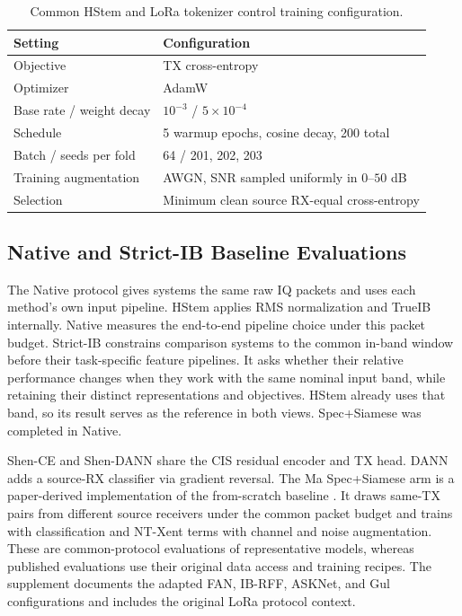 \documentclass[journal]{IEEEtran}
\begin{document}
\begin{table}[!t]\centering
\caption{Common HStem and LoRa tokenizer control training configuration.}
\label{tab:train}
\begin{tabularx}{\columnwidth}{@{}lX@{}}\toprule
Setting & Configuration\\\midrule
Objective & TX cross-entropy\\
Optimizer & AdamW \cite{loshchilov2019adamw}\\
Base rate / weight decay & \(10^{-3}\) / \(5\times10^{-4}\)\\
Schedule & 5 warmup epochs, cosine decay, 200 total\\
Batch / seeds per fold & 64 / 201, 202, 203\\
Training augmentation & AWGN, SNR sampled uniformly in \(0\)--\(50\) dB\\
Selection & Minimum clean source RX-equal cross-entropy\\
\bottomrule\end{tabularx}
\end{table}

\subsection{Native and Strict-IB Baseline Evaluations}
The Native protocol gives systems the same raw IQ packets and uses each method's own input pipeline. HStem applies RMS normalization and TrueIB internally. Native measures the end-to-end pipeline choice under this packet budget. Strict-IB constrains comparison systems to the common in-band window before their task-specific feature pipelines. It asks whether their relative performance changes when they work with the same nominal input band, while retaining their distinct representations and objectives. HStem already uses that band, so its result serves as the reference in both views. Spec+Siamese was completed in Native.

Shen-CE and Shen-DANN share the CIS residual encoder and TX head. DANN adds a source-RX classifier via gradient reversal. The Ma Spec+Siamese arm is a paper-derived implementation of the from-scratch baseline \cite{ma2025robust}. It draws same-TX pairs from different source receivers under the common packet budget and trains with classification and NT-Xent terms with channel and noise augmentation. These are common-protocol evaluations of representative models, whereas published evaluations use their original data access and training recipes. The supplement documents the adapted FAN, IB-RFF, ASKNet, and Gul configurations and includes the original LoRa protocol context.
\end{document}
